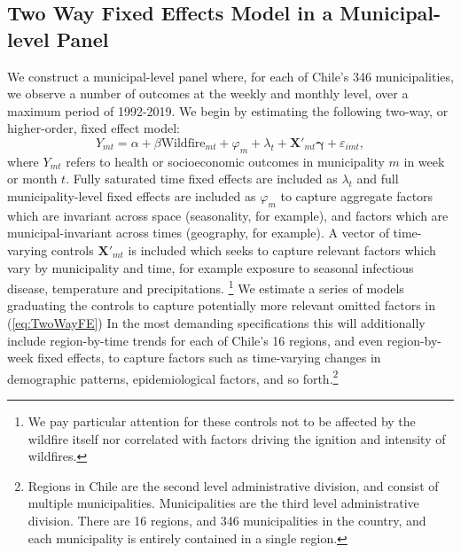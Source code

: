 \documentclass[11pt]{article}
\begin{document}
\begin{spacing}{1.3}
\subsection{Two Way Fixed Effects Model in a Municipal-level Panel}
\label{sscn:comunatime}
We construct a municipal-level panel where, for each of Chile's 346 municipalities, we observe a number of outcomes at the weekly and monthly level, over a maximum period of 1992-2019.  We begin by estimating the following two-way, or higher-order, fixed effect model:
\begin{equation}
\label{eq:TwoWayFE}
Y_{mt}=\alpha + \beta\text{Wildfire}_{mt} + \varphi_m + \lambda_t + \bm{X}'_{mt}\bm{\gamma} + \varepsilon_{imt},
\end{equation}
where $Y_{mt}$ refers to health or socioeconomic outcomes in municipality $m$ in week or month $t$.  Fully saturated time fixed effects are included as $\lambda_t$ and full municipality-level fixed effects are included as $\varphi_m$ to capture aggregate factors which are invariant across space (seasonality, for example), and factors which are municipal-invariant across times (geography, for example).  A vector of time-varying controls $\bm{X}'_{mt}$ is included which seeks to capture relevant factors which vary by municipality and time, for example exposure to seasonal infectious disease, temperature and precipitations. \footnote{We pay particular attention for these controls not to be affected by the wildfire itself nor correlated with factors driving the ignition and intensity  of wildfires.}  We estimate a series of models graduating the controls to capture potentially more relevant omitted factors in (\ref{eq:TwoWayFE})  In the most demanding specifications this will additionally include region-by-time trends for each of Chile's 16 regions, and even region-by-week fixed effects, to capture factors such as time-varying changes in demographic patterns, epidemiological factors, and so forth.\footnote{Regions in Chile are the second level administrative division, and consist of multiple municipalities. Municipalities are the third level administrative division. There are 16 regions, and 346 municipalities in the country, and each municipality is entirely contained in a single region.} 


\end{spacing}
\end{document}
